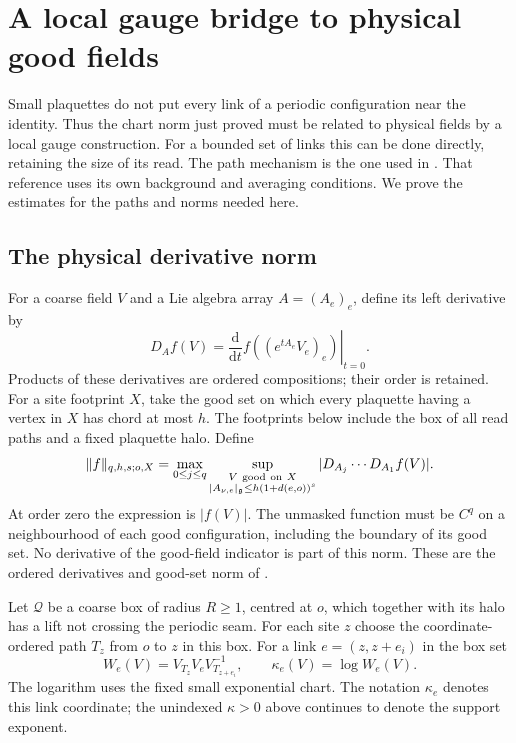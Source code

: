 \documentclass[11pt,reqno]{amsart}
\numberwithin{equation}{section}
\theoremstyle{definition}
\theoremstyle{remark}
\newcommand{\dd}{\mathrm d}
\newcommand{\g}{\mathfrak g}
\begin{document}
\section{A local gauge bridge to physical good fields}
\label{sec:local-physical-bridge}

Small plaquettes do not put every link of a periodic
configuration near the identity.
Thus the chart norm just proved must be related to
physical fields by a local gauge construction.
For a bounded set of links this can be done directly,
retaining the size of its read.
The path mechanism is the one used in
\cite[Sect.~B, Lemma~1 and (1.24)--(1.26),
printed pp.~79--80]{Bal85g}.
That reference uses its own background and averaging
conditions. We prove the estimates for the paths and
norms needed here.

\subsection{The physical derivative norm}

For a coarse field \(V\) and a Lie algebra array
\(A=(A_e)_e\), define its left derivative by
\[
       D_A f(V)=\left.\frac{\dd}{\dd t}
                        f((e^{tA_e}V_e)_e)\right|_{t=0}.
\]
Products of these derivatives are ordered
compositions; their order is retained.
For a site footprint \(X\), take the good set on
which every plaquette having a vertex in \(X\)
has chord at most \(h\).
The footprints below include the box of all read
paths and a fixed plaquette halo.
Define
\begin{equation}
 \|f\|_{q,h,s;o,X}
   =\max_{0\le j\le q}
       \sup_{\substack{V\ {\rm good\ on}\ X\\
                 |A_{\nu,e}|_{\g}\le h(1+d(e,o))^s}}
               |D_{A_j}\cdots D_{A_1}f(V)|.
 \label{eq:local-physical-activity-norm}
\end{equation}
At order zero the expression is \(|f(V)|\).
The unmasked function must be \(C^q\) on a
neighbourhood of each good configuration, including
the boundary of its good set.
No derivative of the good-field indicator is part
of this norm.
These are the ordered derivatives and good-set
norm of \cite[(8.4)--(8.6), pp.~27--28]{Main}.

Let \(\mathcal Q\) be a coarse box of radius
\(R\ge1\), centred at \(o\), which together with
its halo has a lift not crossing the periodic seam.
For each site \(z\) choose the coordinate-ordered
path \(T_z\) from \(o\) to \(z\) in this box.
For a link \(e=(z,z+e_i)\) in the box set
\begin{equation}
       W_e(V)=V_{T_z}V_eV_{T_{z+e_i}}^{-1},\qquad
       \kappa_e(V)=\log W_e(V).
 \label{eq:local-physical-gauge-map}
\end{equation}
The logarithm uses the fixed small exponential chart.
The notation \(\kappa_e\) denotes this link
coordinate; the unindexed \(\kappa>0\) above
continues to denote the support exponent.
\end{document}
